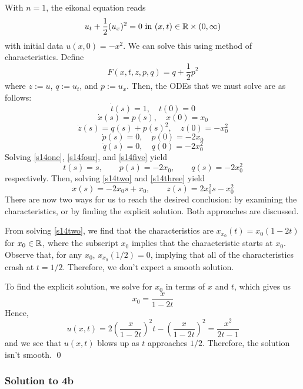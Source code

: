 With $n=1$, the eikonal equation reads
\[
u_t + \frac{1}{2} (u_x)^2 = 0 \,\, \text{in} \,\, (x,t) \in \mathbb{R} \times (0,\infty)
\]
with initial data $u(x,0) = -x^2$. We can solve this using method of characteristics. Define
\[
F(x,t,z,p,q) = q + \frac{1}{2}p^2
\]
where $z := u$, $q := u_t$, and $p := u_x$. Then, the ODEs that we must solve are as follows:
\begin{equation}
\label{s14one} \dot t(s) = 1, \quad t(0) = 0
\end{equation}
\begin{equation}
\label{s14two}
\dot x(s) = p(s), \quad x(0) = x_0
\end{equation}
\begin{equation}
\label{s14three}
\dot z(s) = q(s) + p(s)^2, \quad z(0) = -x_0^2
\end{equation}
\begin{equation}
\label{s14four}
\dot p(s) = 0, \quad p(0) = -2x_0
\end{equation}
\begin{equation}
\label{s14five}
\dot q(s) = 0, \quad q(0) = -2x_0^2
\end{equation}
Solving \eqref{s14one}, \eqref{s14four}, and \eqref{s14five} yield
\[
t(s) = s, \quad \quad p(s) = -2x_0, \quad \quad q(s) = -2x_0^2
\]
respectively. Then, solving \eqref{s14two} and \eqref{s14three} yield
\[
x(s) = -2x_0 s + x_0, \quad \quad z(s) = 2x_0^2 s - x_0^2
\]
There are now two ways for us to reach the desired conclusion: by examining the characteristics, or by finding the explicit solution. Both approaches are discussed.

\vspace{0.4cm}

From solving \eqref{s14two}, we find that the characteristics are $x_{x_0}(t) = x_0 (1-2t)$ for $x_0 \in \mathbb{R}$, where the subscript $x_0$ implies that the characteristic starts at $x_0$. Observe that, for any $x_0$, $x_{x_0}(1/2) = 0$, implying that all of the characteristics crash at $t=1/2$. Therefore, we don't expect a smooth solution.

\vspace{0.4cm}

To find the explicit solution, we solve for $x_0$ in terms of $x$ and $t$, which gives us
\[
x_0 = \frac{x}{1-2t}
\]
Hence,
\[
u(x,t) = 2\left(\frac{x}{1-2t} \right)^2 t - \left( \frac{x}{1-2t} \right)^2 = \frac{x^2}{2t-1}
\]
and we see that $u(x,t)$ blows up as $t$ approaches $1/2$. Therefore, the solution isn't smooth.  \qed

\subsubsection*{Solution to 4b}

